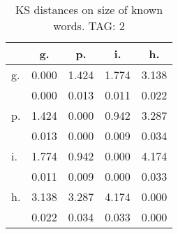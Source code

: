 \begin{table}[h!]
\begin{center}
\begin{tabular}{| l | c | c | c | c |}\hline
 & g. & p. & i. & h. \\\hline
g. & 0.000  & 1.424  & 1.774  & 3.138 \\\hline
 & 0.000  & 0.013  & 0.011  & 0.022 \\\hline
p. & 1.424  & 0.000  & 0.942  & 3.287 \\\hline
 & 0.013  & 0.000  & 0.009  & 0.034 \\\hline
i. & 1.774  & 0.942  & 0.000  & 4.174 \\\hline
 & 0.011  & 0.009  & 0.000  & 0.033 \\\hline
h. & 3.138  & 3.287  & 4.174  & 0.000 \\\hline
 & 0.022  & 0.034  & 0.033  & 0.000 \\\hline
\end{tabular}
\caption{KS distances on size of known words. TAG: 2}
\end{center}
\end{table}